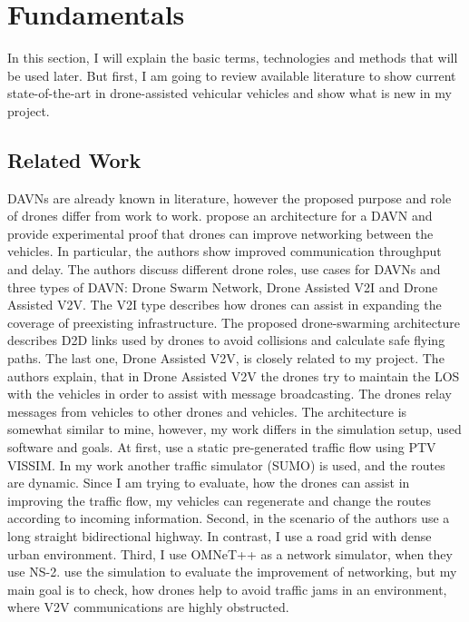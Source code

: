 \documentclass[]{nsm-thesis}
\begin{document}
\chapter{Fundamentals}
\label{sec:fundamentals}

In this section, I will explain the basic terms, technologies and methods that will be used later. But first, I am going to review available literature to show current state-of-the-art in drone-assisted vehicular vehicles and show what is new in my project.


\section {Related Work}

\acp{DAVN} are already known in literature, however the proposed purpose and role of drones differ from work to work. \textcite{shi2018drone} propose an architecture for a \ac{DAVN} and provide experimental proof that drones can improve networking between the vehicles. In particular, the authors show improved communication throughput and delay. The authors discuss different drone roles, use cases for \acp{DAVN} and three types of \ac{DAVN}: Drone Swarm Network, Drone Assisted \ac{V2I} and Drone Assisted \ac{V2V}. The \ac{V2I} type describes how drones can assist in expanding the coverage of preexisting infrastructure. The proposed drone-swarming architecture describes \ac{D2D} links used by drones to avoid collisions and calculate safe flying paths. The last one, Drone Assisted \ac{V2V}, is closely related to my project. The authors explain, that in Drone Assisted \ac{V2V} the drones try to maintain the \ac{LOS} with the vehicles in order to assist with message broadcasting. The drones relay messages from vehicles to other drones and vehicles. The architecture is somewhat similar to mine, however, my work differs in the simulation setup, used software and goals. At first, \textcite{shi2018drone} use a static pre-generated traffic flow using PTV VISSIM. In my work another traffic simulator (SUMO) is used, and the routes are dynamic. Since I am trying to evaluate, how the drones can assist in improving the traffic flow, my vehicles can regenerate and change the routes according to incoming information. Second, in the scenario of \textcite{shi2018drone} the authors use a long straight bidirectional highway. In contrast, I use a road grid with dense urban environment. Third, I use OMNeT++ as a network simulator, when they use \ac{NS-2}. \textcite{shi2018drone} use the simulation to evaluate the improvement of networking, but my main goal is to check, how drones help to avoid traffic jams in an environment, where \ac{V2V} communications are highly obstructed.
\end{document}
